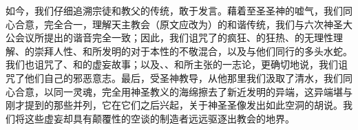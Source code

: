 如今，我们仔细追溯宗徒和教父的传统，敢于发言。藉着至圣圣神的嘘气，我们同心合意，完全合一，理解天主教会（原文应改为）的和谐传统，我们与六次神圣大公会议所提出的谐音完全一致；因此，我们诅咒了的疯狂、的狂热、的无理性理解、的崇拜人性、和所发明的对于本性的不敬混合，以及与他们同行的多头水蛇。我们也诅咒了、和的虚妄故事；以及、、和所主张的一志论，更确切地说，我们诅咒了他们自己的邪恶意志。最后，受圣神教导，从他那里我们汲取了清水，我们同心合意，以同一灵魂，完全用神圣教义的海绵擦去了新近发明的异端，这异端堪与刚才提到的那些并列，它在它们之后兴起，关于神圣圣像发出如此空洞的胡说。我们将这些虚妄却具有颠覆性的空谈的制造者远远驱逐出教会的地界。\par

